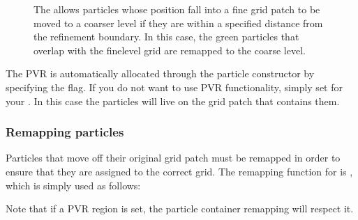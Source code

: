 \documentclass[letterpaper,10pt,english]{sphinxmanual}
\let\sphinxpxdimen\pdfpxdimen\else\newdimen\sphinxpxdimen
\begin{document}
\begin{figure}[htb]
\centering
\capstart

\noindent\sphinxincludegraphics[width=360\sphinxpxdimen]{{ParticleValidRegion}.png}
\caption{The  allows particles whose position fall into a fine grid patch to be moved to a coarser level if they are within a specified distance from the refinement boundary.
In this case, the green particles that overlap with the fine\sphinxhyphen{}level grid are remapped to the coarse level.}\label{\detokenize{Source/Particles:id1}}\end{figure}

\sphinxAtStartPar
The PVR is automatically allocated through the particle constructor by specifying the  flag.
If you do not want to use PVR functionality, simply set  for your .
In this case the particles will live on the grid patch that contains them.


\subsubsection{Remapping particles}
\label{\detokenize{Source/Particles:remapping-particles}}
\sphinxAtStartPar
Particles that move off their original grid patch must be remapped in order to ensure that they are assigned to the correct grid.
The remapping function for  is , which is simply used as follows:

\begin{sphinxVerbatim}[commandchars=\\\{\},formatcom=\scriptsize]
 

\end{sphinxVerbatim}

\sphinxAtStartPar
Note that if a PVR region is set, the particle container remapping will respect it.
\end{document}
